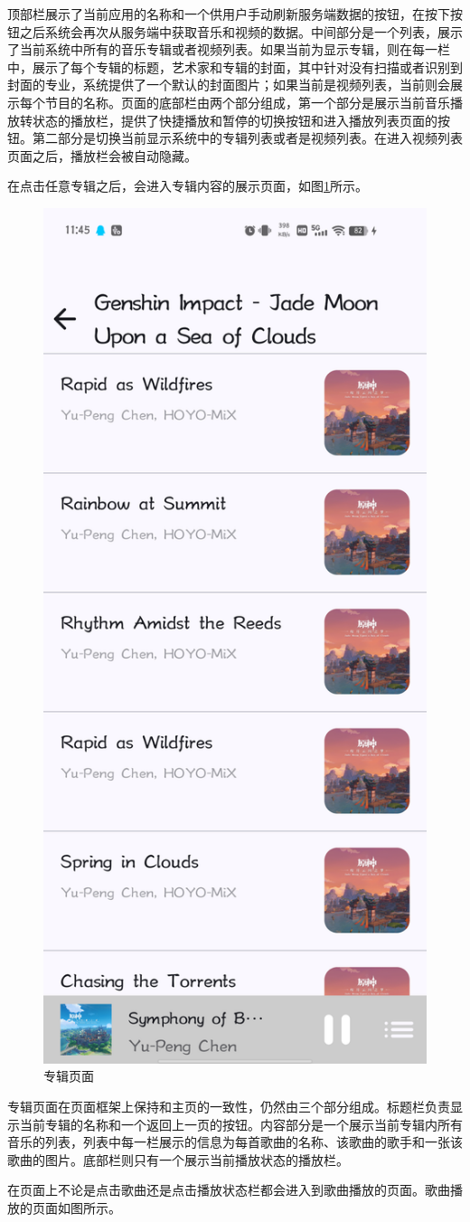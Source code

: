 \documentclass[main.tex]{subfiles}
\begin{document}
顶部栏展示了当前应用的名称和一个供用户手动刷新服务端数据的按钮，在按下按钮之后系统会再次从服务端中获取音乐和视频的数据。中间部分是一个列表，展示了当前系统中所有的音乐专辑或者视频列表。如果当前为显示专辑，则在每一栏中，展示了每个专辑的标题，艺术家和专辑的封面，其中针对没有扫描或者识别到封面的专业，系统提供了一个默认的封面图片；如果当前是视频列表，当前则会展示每个节目的名称。页面的底部栏由两个部分组成，第一个部分是展示当前音乐播放转状态的播放栏，提供了快捷播放和暂停的切换按钮和进入播放列表页面的按钮。第二部分是切换当前显示系统中的专辑列表或者是视频列表。在进入视频列表页面之后，播放栏会被自动隐藏。

在点击任意专辑之后，会进入专辑内容的展示页面，如图\ref{fig:album-page}所示。

\begin{figure}[htbp]
    \centering
    \includegraphics[width=0.4\linewidth]{assets/album-page.png}
    \caption{专辑页面}
    \label{fig:album-page}
\end{figure}

专辑页面在页面框架上保持和主页的一致性，仍然由三个部分组成。标题栏负责显示当前专辑的名称和一个返回上一页的按钮。内容部分是一个展示当前专辑内所有音乐的列表，列表中每一栏展示的信息为每首歌曲的名称、该歌曲的歌手和一张该歌曲的图片。底部栏则只有一个展示当前播放状态的播放栏。

在页面上不论是点击歌曲还是点击播放状态栏都会进入到歌曲播放的页面。歌曲播放的页面如图所示。
\end{document}
